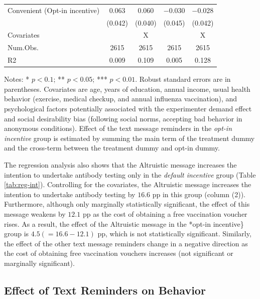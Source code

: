 \documentclass[
]{article}
\begin{document}
\begin{table}
\begin{threeparttable}
\begin{tabular}[t]{lcccc}
\hspace{1em}Convenient (Opt-in incentive) & \num{0.063} & \num{0.060} & \num{-0.030} & \num{-0.028}\\
\hspace{1em} & (\num{0.042}) & (\num{0.040}) & (\num{0.045}) & (\num{0.042})\\
\midrule
Covariates &  & X &  & X\\
Num.Obs. & \num{2615} & \num{2615} & \num{2615} & \num{2615}\\
R2 & \num{0.009} & \num{0.109} & \num{0.005} & \num{0.128}\\
\bottomrule
\end{tabular}
\begin{tablenotes}
\item Notes: * $p < 0.1$; ** $p < 0.05$; *** $p < 0.01$. Robust standard errors are in parentheses. Covariates are age, years of education, annual income, usual health behavior (exercise, medical checkup, and annual influenza vaccination), and psychological factors potentially associated with the experimenter demand effect and social desirability bias (following social norms, accepting bad behavior in anonymous conditions). Effect of the text message reminders in the \emph{opt-in incentive} group is estimated by summing the main term of the treatment dummy and the cross-term between the treatment dummy and opt-in dummy.
\end{tablenotes}
\end{threeparttable}
\end{table}

The regression analysis also shows that the Altruistic message increases the intention to undertake antibody testing only in the \emph{default incentive} group (Table \ref{tab:reg-int}). Controlling for the covariates, the Altruistic message increases the intention to undertake antibody testing by \(16.6\) pp in this group (column (2)). Furthermore, although only marginally statistically significant, the effect of this message weakens by \(12.1\) pp as the cost of obtaining a free vaccination voucher rises. As a result, the effect of the Altruistic message in the *opt-in incentive\} group is \(4.5 (=16.6-12.1)\) pp, which is not statistically significant. Similarly, the effect of the other text message reminders change in a negative direction as the cost of obtaining free vaccination vouchers increases (not significant or marginally significant).

\hypertarget{behavior}{%
\subsection{Effect of Text Reminders on Behavior}\label{behavior}}
\end{document}
